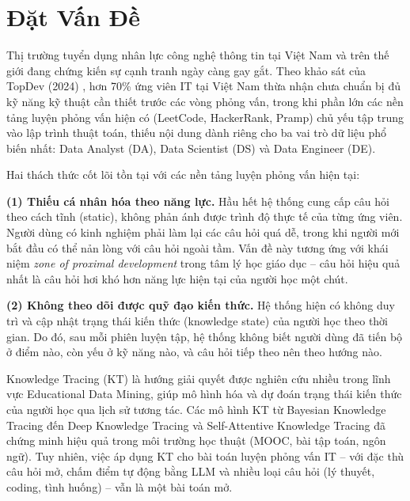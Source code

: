 \documentclass[12pt, a4paper]{report}
\begin{document}
\section{Đặt Vấn Đề}
\label{sec:motivation}

Thị trường tuyển dụng nhân lực công nghệ thông tin tại Việt Nam và trên thế giới đang chứng kiến sự cạnh tranh ngày càng gay gắt. Theo khảo sát của TopDev (2024) \cite{topdev2024}, hơn 70\% ứng viên IT tại Việt Nam thừa nhận chưa chuẩn bị đủ kỹ năng kỹ thuật cần thiết trước các vòng phỏng vấn, trong khi phần lớn các nền tảng luyện phỏng vấn hiện có (LeetCode, HackerRank, Pramp) chủ yếu tập trung vào lập trình thuật toán, thiếu nội dung dành riêng cho ba vai trò dữ liệu phổ biến nhất: Data Analyst (DA), Data Scientist (DS) và Data Engineer (DE).

Hai thách thức cốt lõi tồn tại với các nền tảng luyện phỏng vấn hiện tại:

\textbf{(1) Thiếu cá nhân hóa theo năng lực.} Hầu hết hệ thống cung cấp câu hỏi theo cách tĩnh (static), không phản ánh được trình độ thực tế của từng ứng viên. Người dùng có kinh nghiệm phải làm lại các câu hỏi quá dễ, trong khi người mới bắt đầu có thể nản lòng với câu hỏi ngoài tầm. Vấn đề này tương ứng với khái niệm \textit{zone of proximal development} trong tâm lý học giáo dục \cite{vygotsky1978mind} -- câu hỏi hiệu quả nhất là câu hỏi hơi khó hơn năng lực hiện tại của người học một chút.

\textbf{(2) Không theo dõi được quỹ đạo kiến thức.} Hệ thống hiện có không duy trì và cập nhật trạng thái kiến thức (knowledge state) của người học theo thời gian. Do đó, sau mỗi phiên luyện tập, hệ thống không biết người dùng đã tiến bộ ở điểm nào, còn yếu ở kỹ năng nào, và câu hỏi tiếp theo nên theo hướng nào.

Knowledge Tracing (KT) \cite{corbett1994knowledge} là hướng giải quyết được nghiên cứu nhiều trong lĩnh vực Educational Data Mining, giúp mô hình hóa và dự đoán trạng thái kiến thức của người học qua lịch sử tương tác. Các mô hình KT từ Bayesian Knowledge Tracing \cite{corbett1994knowledge} đến Deep Knowledge Tracing \cite{piech2015deep} và Self-Attentive Knowledge Tracing \cite{pandey2019self} đã chứng minh hiệu quả trong môi trường học thuật (MOOC, bài tập toán, ngôn ngữ). Tuy nhiên, việc áp dụng KT cho bài toán luyện phỏng vấn IT -- với đặc thù câu hỏi mở, chấm điểm tự động bằng LLM và nhiều loại câu hỏi (lý thuyết, coding, tình huống) -- vẫn là một bài toán mở.
\end{document}
